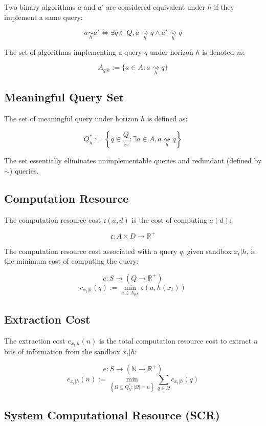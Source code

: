 \documentclass[11pt,a4paper]{article}
\theoremstyle{definition}
\theoremstyle{remark}
\numberwithin{equation}{section}
\begin{document}
Two binary algorithms $a$ and $a'$ are considered equivalent under $h$ if they implement a same query:

\[
a \underset{h}{\sim} a' \iff \exists q \in Q , a \underset{h}{\rightsquigarrow}q \wedge a' \underset{h}{\rightsquigarrow}q
\]

The set of algorithms implementing a query $q$ under horizon $h$ is denoted as:

\[
A_{q|h} := \{ a \in A : a \underset{h}{\rightsquigarrow} q \}
\]

\subsection{Meaningful Query Set}

The set of meaningful query under horizon $h$ is defined as:

\[
Q^*_h := \left\{ q \in \frac{Q}{\sim} : \exists a \in A , a \underset{h}{\rightsquigarrow} q \right\}
\]

The set essentially eliminates unimplementable queries and redundant (defined by $\sim$) queries. 
\subsection{Computation Resource}

The computation resource cost $\mathfrak{c}(a,d)$ is the cost of computing $a(d)$:

\[
\mathfrak{c} : A \times D \rightarrow \mathbb{R}^+
\]

The computation resource cost associated with a query $q$, given sandbox $x_t|h$, is the minimum cost of computing the query:

\[
c : S \rightarrow (Q \rightarrow \mathbb{R}^+)
\]
\[
c_{x_t|h}(q) := \min_{a \in A_{q|h}} \mathfrak{c}(a, h(x_t))
\]

\subsection{Extraction Cost}

The extraction cost $e_{x_t|h}(n)$ is the total computation resource cost to extract $n$ bits of information from the sandbox $x_t|h$:

\[
e : S \rightarrow (\mathbb{N} \rightarrow \mathbb{R}^+)
\]
\[
e_{x_t|h}(n) := \min_{\left\{ \Omega \subseteq Q^*_h : |\Omega| = n \right\}} \sum_{q \in \Omega} c_{x_t|h}(q)
\]

\subsection{System Computational Resource (SCR)}
\end{document}
